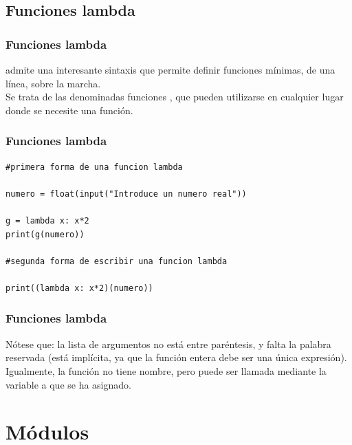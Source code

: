 \subsection{Funciones lambda}
\begin{frame}
\frametitle{Funciones lambda}
\python{} admite una interesante sintaxis que permite definir funciones mínimas, de una línea, sobre la marcha. 
\\
\bigskip
Se trata de las denominadas funciones , que pueden utilizarse en cualquier lugar donde se necesite una función.
\end{frame}
\begin{frame}
\frametitle{Funciones lambda}
\begin{lstlisting}[style=codigopython]
#primera forma de una funcion lambda

numero = float(input("Introduce un numero real"))

g = lambda x: x*2
print(g(numero))

#segunda forma de escribir una funcion lambda

print((lambda x: x*2)(numero)) 
\end{lstlisting}
\end{frame}
\begin{frame}
\frametitle{Funciones lambda}
Nótese que: la lista de argumentos no está entre paréntesis, y falta la palabra reservada  (está implícita, ya que la función entera debe ser una única expresión). 
\\
\bigskip
Igualmente, la función no tiene nombre, pero puede ser llamada mediante la variable a que se ha asignado.
\end{frame}
\section{Módulos}
